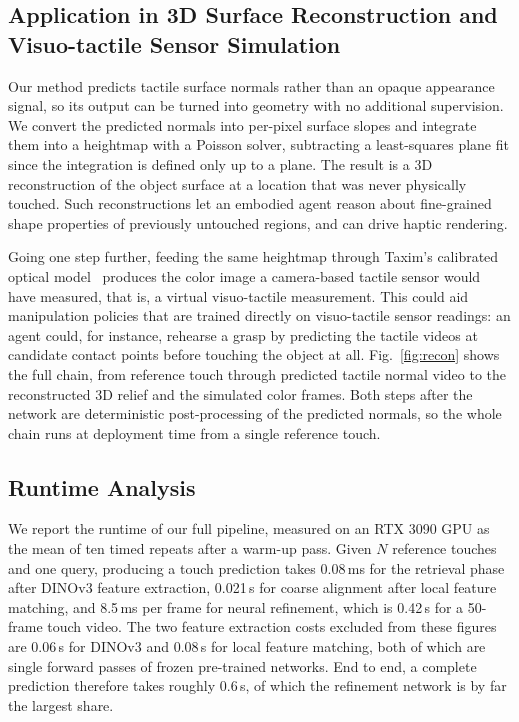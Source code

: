 \subsection{Application in 3D Surface Reconstruction and Visuo-tactile Sensor Simulation}



Our method predicts tactile surface normals rather than an opaque appearance signal, so its
output can be turned into geometry with no additional supervision. We convert the predicted
normals into per-pixel surface slopes and integrate them into a heightmap with a Poisson solver,
subtracting a least-squares plane fit since the integration is defined only up to a plane. The
result is a 3D reconstruction of the object surface at a location that was never physically
touched. Such reconstructions let an embodied agent reason about fine-grained shape properties of
previously untouched regions, and can drive haptic rendering.

Going one step further, feeding the same heightmap through Taxim's calibrated optical
model~\cite{taxim} produces the color image a camera-based tactile sensor would have measured,
that is, a virtual visuo-tactile measurement. This could aid manipulation policies that are trained
directly on visuo-tactile sensor readings: an agent could, for instance, rehearse a grasp by
predicting the tactile videos at candidate contact points before touching the object at all.
Fig.~\ref{fig:recon} shows the full chain, from reference touch through predicted tactile normal
video to the reconstructed 3D relief and the simulated color frames. Both steps after the network
are deterministic post-processing of the predicted normals, so the whole chain runs at deployment
time from a single reference touch.

\subsection{Runtime Analysis}

We report the runtime of our full pipeline, measured on an RTX 3090 GPU as the mean of ten timed
repeats after a warm-up pass. Given $N$ reference touches and one query, producing a touch
prediction takes 0.08\,ms for the retrieval phase after DINOv3 feature extraction, 0.021\,s for
coarse alignment after local feature matching, and 8.5\,ms per frame for neural refinement, which
is 0.42\,s for a 50-frame touch video. The two feature extraction costs excluded from these
figures are 0.06\,s for DINOv3 and 0.08\,s for local feature matching, both of which are single
forward passes of frozen pre-trained networks. End to end, a complete prediction therefore takes
roughly 0.6\,s, of which the refinement network is by far the largest share.

